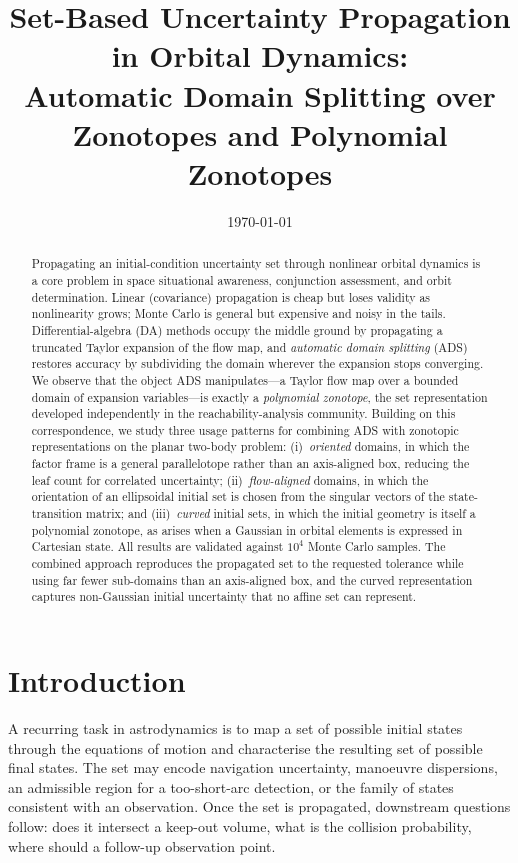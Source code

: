 \documentclass[11pt]{article}
\title{\bfseries Set-Based Uncertainty Propagation in Orbital Dynamics:\\
Automatic Domain Splitting over Zonotopes and Polynomial Zonotopes}
\author{}
\date{\today}
\begin{document}
\maketitle

\begin{abstract}
Propagating an initial-condition uncertainty set through nonlinear orbital
dynamics is a core problem in space situational awareness, conjunction
assessment, and orbit determination. Linear (covariance) propagation is cheap
but loses validity as nonlinearity grows; Monte Carlo is general but expensive
and noisy in the tails. Differential-algebra (DA) methods occupy the middle
ground by propagating a truncated Taylor expansion of the flow map, and
\emph{automatic domain splitting} (ADS) restores accuracy by subdividing the
domain wherever the expansion stops converging. We observe that the object ADS
manipulates---a Taylor flow map over a bounded domain of expansion
variables---is exactly a \emph{polynomial zonotope}, the set representation
developed independently in the reachability-analysis community. Building on this
correspondence, we study three usage patterns for combining ADS with zonotopic
representations on the planar two-body problem: (i)~\emph{oriented} domains, in
which the factor frame is a general parallelotope rather than an axis-aligned
box, reducing the leaf count for correlated uncertainty; (ii)~\emph{flow-aligned}
domains, in which the orientation of an ellipsoidal initial set is chosen from
the singular vectors of the state-transition matrix; and (iii)~\emph{curved}
initial sets, in which the initial geometry is itself a polynomial zonotope, as
arises when a Gaussian in orbital elements is expressed in Cartesian state. All
results are validated against $10^4$ Monte Carlo samples. The combined approach
reproduces the propagated set to the requested tolerance while using far fewer
sub-domains than an axis-aligned box, and the curved representation captures
non-Gaussian initial uncertainty that no affine set can represent.
\end{abstract}

\section{Introduction}

A recurring task in astrodynamics is to map a set of possible initial states
through the equations of motion and characterise the resulting set of possible
final states. The set may encode navigation uncertainty, manoeuvre dispersions,
an admissible region for a too-short-arc detection, or the family of states
consistent with an observation. Once the set is propagated, downstream questions
follow: does it intersect a keep-out volume, what is the collision probability,
where should a follow-up observation point.
\end{document}
